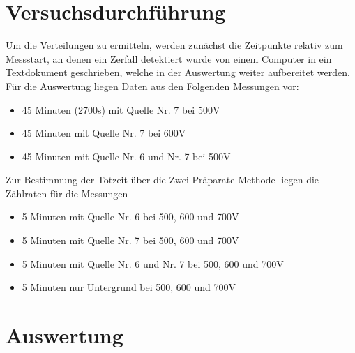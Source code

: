 \documentclass{article}
\begin{document}
    \section{Versuchsdurchführung}
        Um die Verteilungen zu ermitteln, werden zunächst die Zeitpunkte relativ zum Messstart, an denen ein Zerfall detektiert wurde
        von einem Computer in ein Textdokument geschrieben, welche in der Auswertung weiter aufbereitet werden.
        Für die Auswertung liegen Daten aus den Folgenden Messungen vor:
        \begin{itemize}
            \item 45 Minuten (2700s) mit Quelle Nr. 7 bei 500V
            \item 45 Minuten mit Quelle Nr. 7 bei 600V
            \item 45 Minuten mit Quelle Nr. 6 und Nr. 7 bei 500V
        \end{itemize}
        Zur Bestimmung der Totzeit über die Zwei-Präparate-Methode liegen die Zählraten für die Messungen
        \begin{itemize}
            \item 5 Minuten mit Quelle Nr. 6 bei 500, 600 und 700V
            \item 5 Minuten mit Quelle Nr. 7 bei 500, 600 und 700V
            \item 5 Minuten mit Quelle Nr. 6 und Nr. 7 bei 500, 600 und 700V
            \item 5 Minuten nur Untergrund bei 500, 600 und 700V
        \end{itemize}
    \section{Auswertung}
\end{document}
